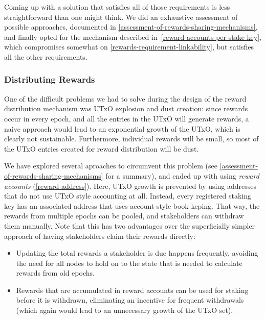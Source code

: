 \documentclass[11pt,a4paper]{article}
\begin{document}
Coming up with a solution that satisfies all of those requirements is
less straightforward than one might think. We did an exhaustive
assessment of possible approaches, documented in
\cref{assessment-of-rewards-sharing-mechanisms}, and finally opted for
the mechanism described in~\ref{reward-accounts-per-stake-key}, which
compromises somewhat on \cref{rewards-requirement-linkability}, but
satisfies all the other requirements.

\subsubsection{Distributing Rewards}
\label{distributing-rewards}

One of the difficult problems we had to solve during the design of the
reward distribution mechanism was UTxO explosion and dust creation:
since rewards occur in every epoch, and all the entries in the UTxO
will generate rewards, a naive approach would lead to an exponential
growth of the UTxO, which is clearly not sustainable. Furthermore,
individual rewards will be small, so most of the UTxO entries created
for reward distribution will be dust.

We have explored several aproaches to circumvent this problem
(see \cref{assessment-of-rewards-sharing-mechanisms} for a summary),
and ended up with using \emph{reward accounts}
(\cref{reward-address}). Here, UTxO growth is prevented by using
addresses that do not use UTxO style accounting at all. Instead, every
registered staking key has an associated address that uses
account-style book-keping. That way, the rewards from multiple epochs
can be pooled, and stakeholders can withdraw them manually. Note that
this has two advantages over the superficially simpler approach of
having stakeholders claim their rewards directly:
\begin{itemize}
\item Updating the total rewards a stakeholder is due happens
  frequently, avoiding the need for all nodes to hold on to the state
  that is needed to calculate rewards from old epochs.
\item Rewards that are accumulated in reward accounts can be used for
  staking before it is withdrawn, eliminating an incentive for
  frequent withdrawals (which again would lead to an unnecessary
  growth of the UTxO set).
\end{itemize}
\end{document}
